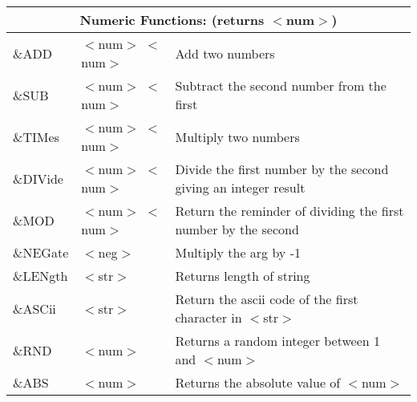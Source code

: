 \begin{tabular}{p{.8in}p{1.7in}p{250pt}}
\multicolumn{3}{c}{Numeric Functions:  (returns $<${}num$>${})}\\ \hline
\&ADD & $<${}num$>${} $<${}num$>${} & Add two numbers\\

\&SUB & $<${}num$>${} $<${}num$>${} & Subtract the second number from
the first\\

\&TIMes & $<${}num$>${} $<${}num$>${} & Multiply two numbers\\

\&DIVide & $<${}num$>${} $<${}num$>${} & Divide the first number by
the second giving an integer result\\

\&MOD & $<${}num$>${} $<${}num$>${} & Return the reminder of dividing the
first number by the second\\

\&NEGate & $<${}neg$>${} & Multiply the arg by -1\\

\&LENgth & $<${}str$>${} & Returns length of string\\

\&ASCii & $<${}str$>${} & Return the ascii code of the first
character in $<${}str$>${}\\

\&RND & $<${}num$>${} & Returns a random integer between 1 and
$<${}num$>${}\\

\&ABS & $<${}num$>${} & Returns the absolute value of $<${}num$>${}\\

\end{tabular}

